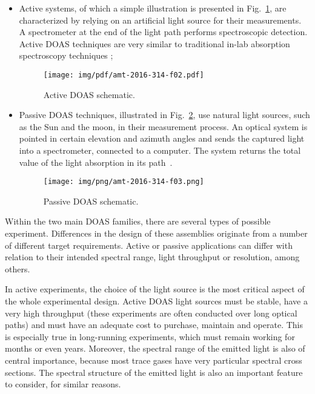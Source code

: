\begin{itemize}

        \item Active systems, of which a simple illustration is
            presented in Fig.~\ref{fig:activeSmall}, are characterized
            by relying on an artificial light source for their
            measurements. A spectrometer at the end of the light path
            performs spectroscopic detection. Active DOAS techniques are
            very similar to traditional in-lab absorption spectroscopy
            techniques \cite{Platt2007};

            \begin{figure}[htb]
                \centering
                \texttt{[image: img/pdf/amt-2016-314-f02.pdf]}
                \caption{Active DOAS schematic.}\label{fig:activeSmall}
              \end{figure}

        \item Passive DOAS techniques, illustrated in
            Fig.~\ref{fig:passiveSchematic}, use natural light sources,
            such as the Sun and the moon, in their measurement process.
            An optical system is pointed in certain elevation and
            azimuth angles and sends the captured light into a
            spectrometer, connected to a computer. The system returns
            the total value of the light absorption in its
            path~\cite{Platt2007,Merlaud2013}.

              \begin{figure}[htb]
                  \centering
                  \texttt{[image: img/png/amt-2016-314-f03.png]}
                  \caption{Passive DOAS schematic.}\label{fig:passiveSchematic}
              \end{figure}
\end{itemize}

Within the two main \gls{DOAS} families, there are several types of
possible experiment. Differences in the design of these assemblies
originate from a number of different target requirements. Active or
passive applications can differ with relation to their intended spectral
range, light throughput or resolution, among others.

In active experiments, the choice of the light source is the most
critical aspect of the whole experimental design. Active \gls{DOAS}
light sources must be stable, have a very high throughput (these
experiments are often conducted over long optical paths) and must have
an adequate cost to purchase, maintain and operate. This is especially
true in long-running experiments, which must remain working for months
or even years. Moreover, the spectral range of the emitted light is also
of central importance, because most trace gases have very particular
spectral cross sections. The spectral structure of the emitted light is
also an important feature to consider, for similar reasons.

